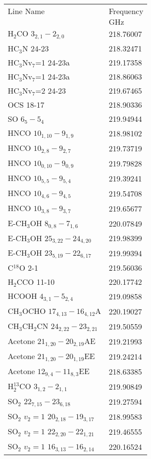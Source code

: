 \begin{table*}[htp]
\begin{minipage}[t]{0.5\textwidth}
\begin{tabular}{ll}
\label{tab:linesspw1}
Line Name & Frequency \\
 & $\mathrm{GHz}$ \\
\hline
H$_2$CO $3_{2,1}-2_{2,0}$ & 218.76007 \\
HC$_3$N 24-23 & 218.32471 \\
HC$_3$Nv$_7$=1 24-23a & 219.17358 \\
HC$_3$Nv$_7$=1 24-23a & 218.86063 \\
HC$_3$Nv$_7$=2 24-23 & 219.67465 \\
OCS 18-17 & 218.90336 \\
SO $6_5-5_4$ & 219.94944 \\
HNCO $10_{1,10}-9_{1,9}$ & 218.98102 \\
HNCO $10_{2,8}-9_{2,7}$ & 219.73719 \\
HNCO $10_{0,10}-9_{0,9}$ & 219.79828 \\
HNCO $10_{5,5}-9_{5,4}$ & 219.39241 \\
HNCO $10_{4,6}-9_{4,5}$ & 219.54708 \\
HNCO $10_{3,8}-9_{3,7}$ & 219.65677 \\
E-CH$_3$OH $8_{0,8}-7_{1,6}$ & 220.07849 \\
E-CH$_3$OH $25_{3,22}-24_{4,20}$ & 219.98399 \\
E-CH$_3$OH $23_{5,19}-22_{6,17}$ & 219.99394 \\
C$^{18}$O 2-1 & 219.56036 \\
H$_2$CCO 11-10 & 220.17742 \\
HCOOH $4_{3,1}-5_{2,4}$ & 219.09858 \\
CH$_3$OCHO $17_{4,13}-16_{4,12}$A & 220.19027 \\
CH$_3$CH$_2$CN $24_{2,22}-23_{2,21}$ & 219.50559 \\
Acetone $21_{1,20}-20_{2,19}$AE & 219.21993 \\
Acetone $21_{1,20}-20_{1,19}$EE & 219.24214 \\
Acetone $12_{9,4}-11_{8,3}$EE & 218.63385 \\
H$_2^{13}$CO $3_{1,2}-2_{1,1}$ & 219.90849 \\
SO$_2$ $22_{7,15}-23_{6,18}$ & 219.27594 \\
SO$_2$ $v_2=1$ $20_{2,18}-19_{3,17}$ & 218.99583 \\
SO$_2$ $v_2=1$ $22_{2,20}-22_{1,21}$ & 219.46555 \\
SO$_2$ $v_2=1$ $16_{3,13}-16_{2,14}$ & 220.16524 \\
\hline
\end{tabular}


\end{minipage}
\end{table*}
